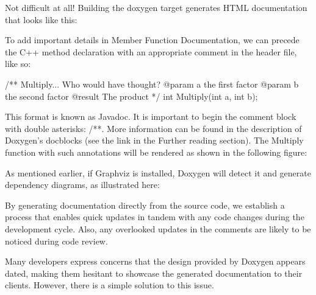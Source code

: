
Not difficult at all! Building the doxygen target generates HTML documentation that looks like this:


To add important details in Member Function Documentation, we can precede the C++ method declaration with an appropriate comment in the header file, like so:


\begin{cpp}
/**
    Multiply... Who would have thought?
    @param a the first factor
    @param b the second factor
    @result The product
*/
int Multiply(int a, int b);
\end{cpp}

This format is known as Javadoc. It is important to begin the comment block with double asterisks: /**. More information can be found in the description of Doxygen’s docblocks (see the link in the Further reading section). The Multiply function with such annotations will be rendered as shown in the following figure:


As mentioned earlier, if Graphviz is installed, Doxygen will detect it and generate dependency diagrams, as illustrated here:


By generating documentation directly from the source code, we establish a process that enables quick updates in tandem with any code changes during the development cycle. Also, any overlooked updates in the comments are likely to be noticed during code review.

Many developers express concerns that the design provided by Doxygen appears dated, making them hesitant to showcase the generated documentation to their clients. However, there is a simple solution to this issue.



















































